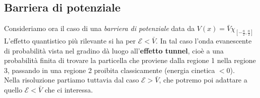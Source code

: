 \documentclass[../../FisicaTeorica.tex]{subfiles}
\begin{document}
\subsection{Barriera di potenziale}
Consideriamo ora il caso di una \textit{barriera di potenziale} data da $V(x)=\bar{V}\chi_{\left[-\frac{a}{2},\frac{a}{2}\right]}$
L'effetto quantistico più rilevante si ha per $\mathcal{E}<\bar{V}$. In tal caso l'onda evanescente di probabilità vista nel gradino dà luogo all'\textbf{effetto tunnel}, cioè a una probabilità finita di trovare la particella che proviene dalla regione 1 nella regione 3, passando in una regione 2 proibita classicamente (energia cinetica $<0$).\\

Nella risoluzione partiamo tuttavia dal caso $\mathcal{E}>\bar{V}$, che potremo poi adattare a quello $\mathcal{E}<\bar{V}$ che ci interessa.\\
\end{document}
